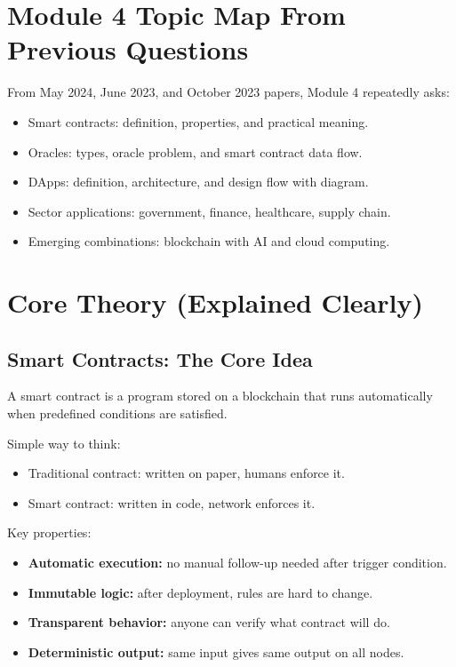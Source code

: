\documentclass[12pt,a4paper]{article}
\begin{document}
\section{Module 4 Topic Map From Previous Questions}

From May 2024, June 2023, and October 2023 papers, Module 4 repeatedly asks:

\begin{itemize}
\item Smart contracts: definition, properties, and practical meaning.
\item Oracles: types, oracle problem, and smart contract data flow.
\item DApps: definition, architecture, and design flow with diagram.
\item Sector applications: government, finance, healthcare, supply chain.
\item Emerging combinations: blockchain with AI and cloud computing.
\end{itemize}

\section{Core Theory (Explained Clearly)}

\subsection{Smart Contracts: The Core Idea}
A smart contract is a program stored on a blockchain that runs automatically when predefined conditions are satisfied.

Simple way to think:
\begin{itemize}
\item Traditional contract: written on paper, humans enforce it.
\item Smart contract: written in code, network enforces it.
\end{itemize}

Key properties:
\begin{itemize}
\item \textbf{Automatic execution:} no manual follow-up needed after trigger condition.
\item \textbf{Immutable logic:} after deployment, rules are hard to change.
\item \textbf{Transparent behavior:} anyone can verify what contract will do.
\item \textbf{Deterministic output:} same input gives same output on all nodes.
\end{itemize}
\end{document}
